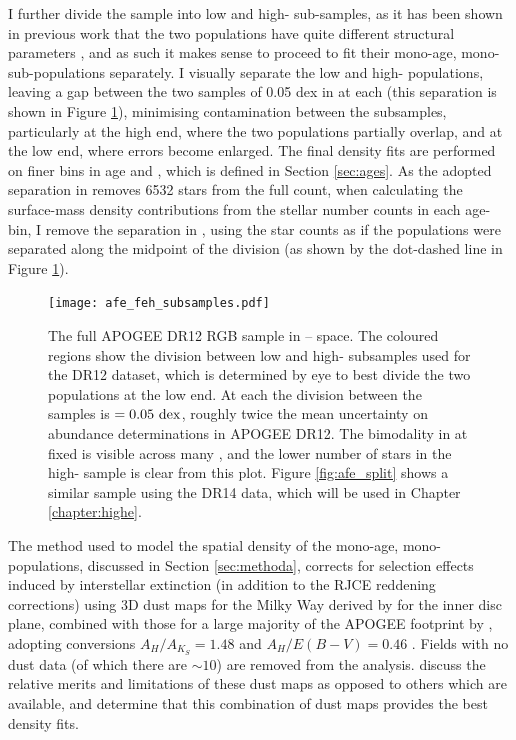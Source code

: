 I further divide the sample into low and high-\afe{} sub-samples, as it has been shown in previous work that the two populations have quite different structural parameters \citep{2016ApJ...823...30B}, and as such it makes sense to proceed to fit their mono-age, mono-\feh{} sub-populations separately. I visually separate the low and high-\afe{} populations, leaving a gap between the two samples of 0.05 dex in \afe{} at each \feh{} (this separation is shown in Figure \ref{fig:afe_feh}), minimising contamination between the subsamples, particularly at the high \feh{} end, where the two populations partially overlap, and at the low \feh{} end, where \afe{} errors become enlarged. The final density fits are performed on finer bins in age and \feh{}, which is defined in Section \ref{sec:ages}. As the adopted separation in \afe{} removes 6532 stars from the full count, when calculating the surface-mass density contributions from the stellar number counts in each age-\feh{} bin, I remove the separation in \afe{}, using the star counts as if the populations were separated along the midpoint of the division (as shown by the dot-dashed line in Figure \ref{fig:afe_feh}). 

 \begin{figure}
  \centering
 	\texttt{[image: afe\_feh\_subsamples.pdf]}
    \caption[\afe{}--\feh{} for the APOGEE DR12 sample, demonstrating the division used to divide between high and low-\afe{} populations in Chapter \ref{chapter:apogeestruc}]{The full APOGEE DR12 RGB sample in \afe{}--\feh{} space. The coloured regions show the division between low and high-\afe{} subsamples used for the DR12 dataset, which is determined by eye to best divide the two populations at the low \feh{} end. At each \feh{} the division between the samples is \afe{} $= 0.05 \ \rm{dex}$, roughly twice the mean uncertainty on \afe{} abundance determinations in APOGEE DR12. The bimodality in \afe{} at fixed \feh{} is visible across many \feh{}, and the lower number of stars in the high-\afe{} sample is clear from this plot. Figure \ref{fig:afe_split} shows a similar sample using the DR14 data, which will be used in Chapter \ref{chapter:highe}.}
 \label{fig:afe_feh}
\end{figure}


The method used to model the spatial density of the mono-age, mono-\feh{} populations, discussed in Section \ref{sec:methoda}, corrects for selection effects induced by interstellar extinction (in addition to the RJCE reddening corrections) using 3D dust maps for the Milky Way derived by \citet{2006A&A...453..635M} for the inner disc plane, combined with those for a large majority of the APOGEE footprint by \citep{2015ApJ...810...25G}, adopting conversions $A_H/A_{K_S}=1.48$ and $A_H/E(B-V) = 0.46$ \citep{2011ApJ...737..103S,2013MNRAS.430.2188Y}.  Fields with no dust data (of which there are $\sim 10$) are removed from the analysis. \citet{2016ApJ...823...30B} discuss the relative merits and limitations of these dust maps as opposed to others which are available, and determine that this combination of dust maps provides the best density fits.


